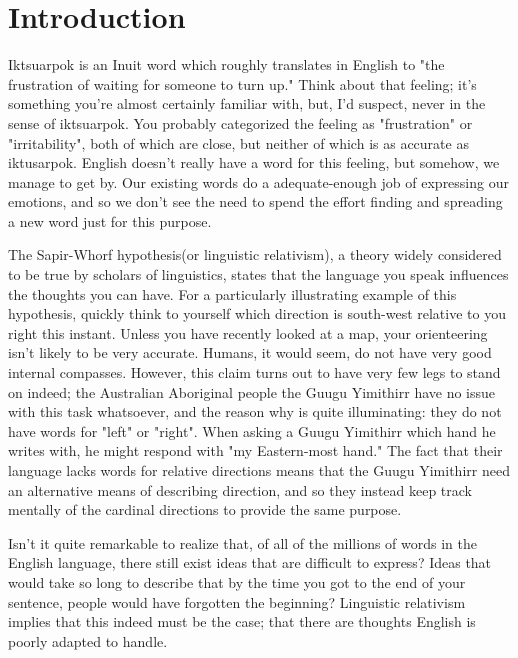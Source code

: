 \chapter{Introduction}
Iktsuarpok is an Inuit word which roughly translates in English to "the frustration of waiting for someone to turn up."
Think about that feeling; it's something you're almost certainly familiar with, but, I'd suspect, never in the sense of
iktsuarpok. You probably categorized the feeling as "frustration" or "irritability", both of which are close, but
neither of which is as accurate as iktusarpok. English doesn't really have a word for this feeling, but somehow, we
manage to get by. Our existing words do a adequate-enough job of expressing our emotions, and so we don't see the need
to spend the effort finding and spreading a new word just for this purpose.

The Sapir-Whorf hypothesis(or linguistic relativism), a theory widely considered
to be true by scholars of linguistics, states that the language you speak influences the thoughts you can have. For a
particularly illustrating example of this hypothesis, quickly think to yourself which direction is south-west relative
to you right this instant.  Unless you have recently looked at a map, your orienteering isn't likely to be very
accurate. Humans, it would seem, do not have very good internal compasses. However, this claim turns out to have very
few legs to stand on indeed; the Australian Aboriginal people the Guugu Yimithirr
\cite{http://en.wikipedia.org/wiki/Relative_direction} have no issue with this task whatsoever, and the reason why is
quite illuminating: they do not have words for "left" or "right". When asking a Guugu Yimithirr which hand he writes
with, he might respond with "my Eastern-most hand." The fact that their language lacks words for relative directions
means that the Guugu Yimithirr need an alternative means of describing direction, and so they instead keep track
mentally of the cardinal directions to provide the same purpose.

Isn't it quite remarkable to realize that, of all of the millions of words in the
English language, there still exist ideas that are difficult to express? Ideas that would take so long to describe that
by the time you got to the end of your sentence, people would have forgotten the beginning? Linguistic relativism
implies that this indeed must be the case; that there are thoughts English is poorly adapted to handle.

